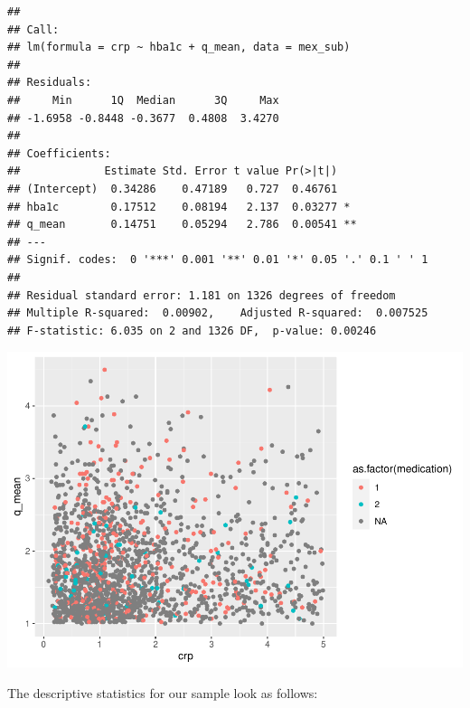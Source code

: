 \documentclass[
  man,floatsintext]{apa6}
\begin{document}
\begin{verbatim}
## 
## Call:
## lm(formula = crp ~ hba1c + q_mean, data = mex_sub)
## 
## Residuals:
##     Min      1Q  Median      3Q     Max 
## -1.6958 -0.8448 -0.3677  0.4808  3.4270 
## 
## Coefficients:
##             Estimate Std. Error t value Pr(>|t|)   
## (Intercept)  0.34286    0.47189   0.727  0.46761   
## hba1c        0.17512    0.08194   2.137  0.03277 * 
## q_mean       0.14751    0.05294   2.786  0.00541 **
## ---
## Signif. codes:  0 '***' 0.001 '**' 0.01 '*' 0.05 '.' 0.1 ' ' 1
## 
## Residual standard error: 1.181 on 1326 degrees of freedom
## Multiple R-squared:  0.00902,    Adjusted R-squared:  0.007525 
## F-statistic: 6.035 on 2 and 1326 DF,  p-value: 0.00246
\end{verbatim}

\includegraphics{Final_Groupof5_files/figure-latex/unnamed-chunk-9-1.pdf}

The descriptive statistics for our sample look as follows:
\end{document}

